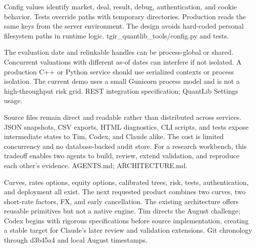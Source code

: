 {Config values identify market, deal, result, debug, authentication, and cookie behavior.}
{Tests override paths with temporary directories.}
{Production reads the same keys from the server environment.}
{The design avoids hard-coded personal filesystem paths in runtime logic.}
{tgir\_quantlib\_tools/config.py and tests.}

{The evaluation date and relinkable handles can be process-global or shared.}
{Concurrent valuations with different as-of dates can interfere if not isolated.}
{A production C++ or Python service should use serialized contexts or process isolation.}
{The current demo uses a small Gunicorn process model and is not a high-throughput risk grid.}
{REST integration specification; QuantLib Settings usage.}

{Source files remain direct and readable rather than distributed across services.}
{JSON snapshots, CSV exports, HTML diagnostics, CLI scripts, and tests expose intermediate states to Tim, Codex, and Claude alike.}
{The cost is limited concurrency and no database-backed audit store.}
{For a research workbench, this tradeoff enables two agents to build, review, extend validation, and reproduce each other's evidence.}
{AGENTS.md; ARCHITECTURE.md.}

{Curves, rates options, equity options, calibrated trees, risk, tests, authentication, and deployment all exist.}
{The next requested product combines two curves, two short-rate factors, FX, and early cancellation.}
{The existing architecture offers reusable primitives but not a native engine.}
{Tim directs the August challenge; Codex begins with rigorous specifications before source implementation, creating a stable target for Claude's later review and validation extensions.}
{Git chronology through d3b45a4 and local August timestamps.}

